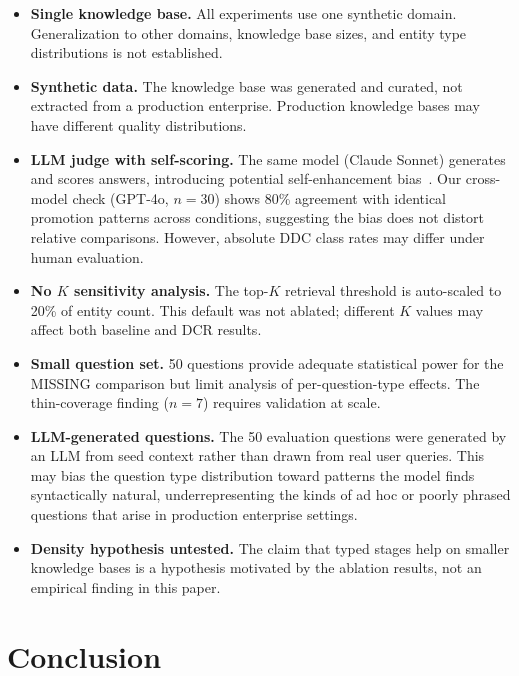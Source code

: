 \documentclass[11pt,a4paper]{article}
\begin{document}
\begin{itemize}[nosep]
  \item \textbf{Single knowledge base.} All experiments use one synthetic domain. Generalization to other domains, knowledge base sizes, and entity type distributions is not established.
  \item \textbf{Synthetic data.} The knowledge base was generated and curated, not extracted from a production enterprise. Production knowledge bases may have different quality distributions.
  \item \textbf{LLM judge with self-scoring.} The same model (Claude Sonnet) generates and scores answers, introducing potential self-enhancement bias~\citep{zheng2023judging}. Our cross-model check (GPT-4o, $n = 30$) shows 80\% agreement with identical promotion patterns across conditions, suggesting the bias does not distort relative comparisons. However, absolute DDC class rates may differ under human evaluation.
  \item \textbf{No $K$ sensitivity analysis.} The top-$K$ retrieval threshold is auto-scaled to 20\% of entity count. This default was not ablated; different $K$ values may affect both baseline and DCR results.
  \item \textbf{Small question set.} 50 questions provide adequate statistical power for the MISSING comparison but limit analysis of per-question-type effects. The thin-coverage finding ($n = 7$) requires validation at scale.
  \item \textbf{LLM-generated questions.} The 50 evaluation questions were generated by an LLM from seed context rather than drawn from real user queries. This may bias the question type distribution toward patterns the model finds syntactically natural, underrepresenting the kinds of ad hoc or poorly phrased questions that arise in production enterprise settings.
  \item \textbf{Density hypothesis untested.} The claim that typed stages help on smaller knowledge bases is a hypothesis motivated by the ablation results, not an empirical finding in this paper.
\end{itemize}

\section{Conclusion}
\label{sec:conclusion}
\end{document}
